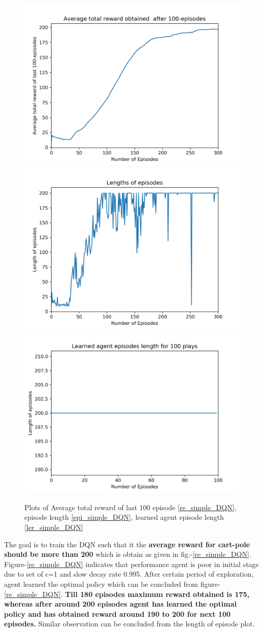 \documentclass[preprint,12pt]{elsarticle}
\begin{document}
  \begin{figure}[H]
  	\centering  
  	\subfigure
  	{\includegraphics[width=0.4\linewidth]{./Avg_rewards.png}\label{re_simple_DQN}}
  	\subfigure
 	{\includegraphics[width=0.4\linewidth]{./Episode_lengths.png}\label{epi_simple_DQN}}
  	\subfigure
	{\includegraphics[width=0.4\linewidth]{./Learned_Episode_lengths.png}\label{ler_simple_DQN}}
  	\caption{Plots of Average total reward of last 100 episode \ref{re_simple_DQN}, episode length \ref{epi_simple_DQN}, learned agent episode length \ref{ler_simple_DQN}}
  	\label{fig:simple}
  \end{figure}
  
  The goal is to train the DQN such that it the \textbf{average reward for cart-pole should be more than 200} which is obtain as given in fig.-\ref{re_simple_DQN}. Figure-\ref{re_simple_DQN} indicates that performance agent is poor in initial stage due to set of $\epsilon$=1 and slow decay rate 0.995. After certain period of exploration, agent learned the optimal policy which can be concluded from figure-\ref{re_simple_DQN}. \textbf{Till 180 episodes maximum reward obtained is 175, whereas after around 200 episodes agent has learned the optimal policy and has obtained reward around 190 to 200 for next 100 episodes.} Similar observation can be concluded from the length of episode plot. 
  
\end{document}
